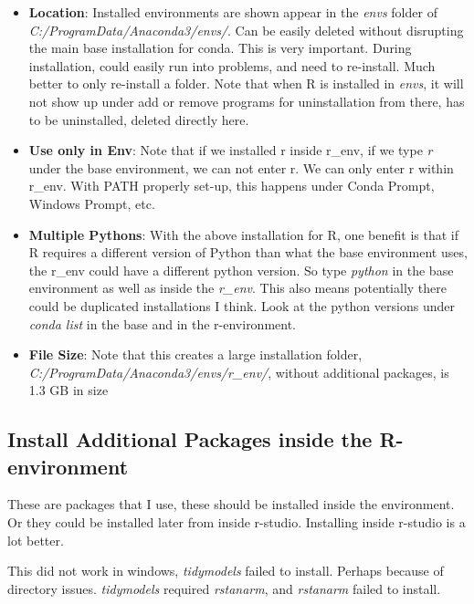 \documentclass[
]{article}
\providecommand{\tightlist}{%
  \setlength{\itemsep}{0pt}\setlength{\parskip}{0pt}}
\begin{document}
\begin{itemize}
\tightlist
\item
  \textbf{Location}: Installed environments are shown appear in the
  \emph{envs} folder of \emph{C:/ProgramData/Anaconda3/envs/}. Can be
  easily deleted without disrupting the main base installation for
  conda. This is very important. During installation, could easily run
  into problems, and need to re-install. Much better to only re-install
  a folder. Note that when R is installed in \emph{envs}, it will not
  show up under add or remove programs for uninstallation from there,
  has to be uninstalled, deleted directly here.
\item
  \textbf{Use only in Env}: Note that if we installed r inside r\_env,
  if we type \emph{r} under the base environment, we can not enter r. We
  can only enter r within r\_env. With PATH properly set-up, this
  happens under Conda Prompt, Windows Prompt, etc.
\item
  \textbf{Multiple Pythons}: With the above installation for R, one
  benefit is that if R requires a different version of Python than what
  the base environment uses, the r\_env could have a different python
  version. So type \emph{python} in the base environment as well as
  inside the \emph{r\_env}. This also means potentially there could be
  duplicated installations I think. Look at the python versions under
  \emph{conda list} in the base and in the r-environment.
\item
  \textbf{File Size}: Note that this creates a large installation
  folder, \emph{C:/ProgramData/Anaconda3/envs/r\_env/}, without
  additional packages, is 1.3 GB in size
\end{itemize}

\hypertarget{install-additional-packages-inside-the-r-environment}{%
\subsection{Install Additional Packages inside the
R-environment}\label{install-additional-packages-inside-the-r-environment}}

These are packages that I use, these should be installed inside the
environment. Or they could be installed later from inside r-studio.
Installing inside r-studio is a lot better.

This did not work in windows, \emph{tidymodels} failed to install.
Perhaps because of directory issues. \emph{tidymodels} required
\emph{rstanarm}, and \emph{rstanarm} failed to install.
\end{document}
